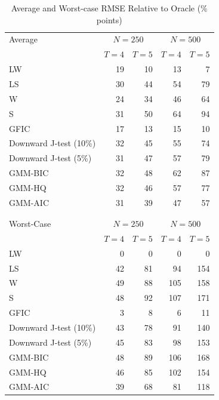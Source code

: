 \begin{table}[!tbp]
\begin{center}
\begin{tabular}{lrrrr}
\hline\hline
\multicolumn{1}{l}{Average}&\multicolumn{2}{c}{$N = 250$}&\multicolumn{2}{c}{$N = 500$}\\
&\multicolumn{1}{c}{$T=4$}&\multicolumn{1}{c}{$T=5$}&\multicolumn{1}{c}{$T=4$}&\multicolumn{1}{c}{$T=5$}\tabularnewline
\hline
LW&19&10&13& 7\tabularnewline
LS&30&44&54&79\tabularnewline
W&24&34&46&64\tabularnewline
S&31&50&64&94\tabularnewline
\hline
GFIC&17&13&15&10\tabularnewline
Downward J-test (10\%)&32&45&55&74\tabularnewline
Downward J-test (5\%)&31&47&57&79\tabularnewline
GMM-BIC&32&48&62&87\tabularnewline
GMM-HQ&32&46&57&77\tabularnewline
GMM-AIC&31&39&47&57\tabularnewline
\hline\\ \\ 

\hline\hline
\multicolumn{1}{l}{Worst-Case}&\multicolumn{2}{c}{$N = 250$}&\multicolumn{2}{c}{$N = 500$}\\
&\multicolumn{1}{c}{$T=4$}&\multicolumn{1}{c}{$T=5$}&\multicolumn{1}{c}{$T=4$}&\multicolumn{1}{c}{$T=5$}\tabularnewline
\hline
LW& 0& 0&  0&  0\tabularnewline
LS&42&81& 94&154\tabularnewline
W&49&88&105&158\tabularnewline
S&48&92&107&171\tabularnewline
\hline
GFIC& 3& 8&  6& 11\tabularnewline
Downward J-test (10\%)&43&78& 91&140\tabularnewline
Downward J-test (5\%)&45&83& 98&153\tabularnewline
GMM-BIC&48&89&106&168\tabularnewline
GMM-HQ&46&85&102&154\tabularnewline
GMM-AIC&39&68& 81&118\tabularnewline
\hline

\end{tabular}
\end{center}
\caption{Average and Worst-case RMSE Relative to Oracle (\% points)}
\label{tab:rel}
\end{table}


